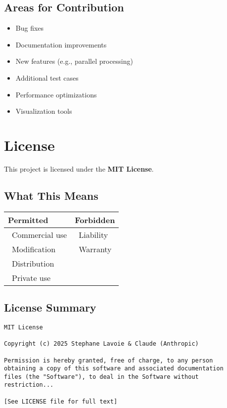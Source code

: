 \documentclass[11pt,a4paper]{article}
\newcommand{\cmark}{\ding{51}}
\newcommand{\xmark}{\ding{55}}
\begin{document}
\subsection{Areas for Contribution}

\begin{itemize}[leftmargin=*,noitemsep]
\item Bug fixes
\item Documentation improvements
\item New features (e.g., parallel processing)
\item Additional test cases
\item Performance optimizations
\item Visualization tools
\end{itemize}

\section{License}

This project is licensed under the \textbf{MIT License}.

\subsection{What This Means}

\begin{table}[H]
\centering
\begin{tabular}{@{}ll@{}}
\toprule
\textbf{Permitted} & \textbf{Forbidden} \\
\midrule
\cmark\ Commercial use & \xmark\ Liability \\
\cmark\ Modification & \xmark\ Warranty \\
\cmark\ Distribution & \\
\cmark\ Private use & \\
\bottomrule
\end{tabular}
\end{table}

\subsection{License Summary}

\begin{verbatim}
MIT License

Copyright (c) 2025 Stephane Lavoie & Claude (Anthropic)

Permission is hereby granted, free of charge, to any person
obtaining a copy of this software and associated documentation
files (the "Software"), to deal in the Software without
restriction...

[See LICENSE file for full text]
\end{verbatim}
\end{document}
